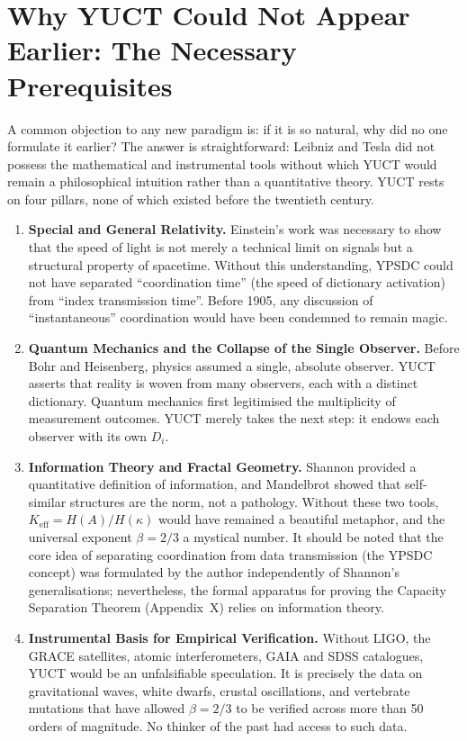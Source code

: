 \documentclass[12pt,a4paper]{article}
\begin{document}
	\section{Why YUCT Could Not Appear Earlier: The Necessary Prerequisites}
	\label{sec:prerequisites}
	
	A common objection to any new paradigm is: if it is so natural, why did no one formulate it earlier? The answer is straightforward: Leibniz and Tesla did not possess the mathematical and instrumental tools without which YUCT would remain a philosophical intuition rather than a quantitative theory. YUCT rests on four pillars, none of which existed before the twentieth century.
	
	\begin{enumerate}[leftmargin=*, label=\textbf{\arabic*.}]
		\item \textbf{Special and General Relativity.} Einstein's work was necessary to show that the speed of light is not merely a technical limit on signals but a structural property of spacetime. Without this understanding, YPSDC could not have separated ``coordination time'' (the speed of dictionary activation) from ``index transmission time''. Before 1905, any discussion of ``instantaneous'' coordination would have been condemned to remain magic.
		
		\item \textbf{Quantum Mechanics and the Collapse of the Single Observer.} Before Bohr and Heisenberg, physics assumed a single, absolute observer. YUCT asserts that reality is woven from many observers, each with a distinct dictionary. Quantum mechanics first legitimised the multiplicity of measurement outcomes. YUCT merely takes the next step: it endows each observer with its own \(D_i\).
		
		\item \textbf{Information Theory and Fractal Geometry.} Shannon provided a quantitative definition of information, and Mandelbrot showed that self-similar structures are the norm, not a pathology. Without these two tools, \(K_{\mathrm{eff}} = H(A)/H(\kappa)\) would have remained a beautiful metaphor, and the universal exponent \(\beta=2/3\) a mystical number. It should be noted that the core idea of separating coordination from data transmission (the YPSDC concept) was formulated by the author independently of Shannon's generalisations; nevertheless, the formal apparatus for proving the Capacity Separation Theorem (Appendix~X) relies on information theory.
		
		\item \textbf{Instrumental Basis for Empirical Verification.} Without LIGO, the GRACE satellites, atomic interferometers, GAIA and SDSS catalogues, YUCT would be an unfalsifiable speculation. It is precisely the data on gravitational waves, white dwarfs, crustal oscillations, and vertebrate mutations that have allowed \(\beta=2/3\) to be verified across more than 50 orders of magnitude. No thinker of the past had access to such data.
	\end{enumerate}
	
\end{document}
